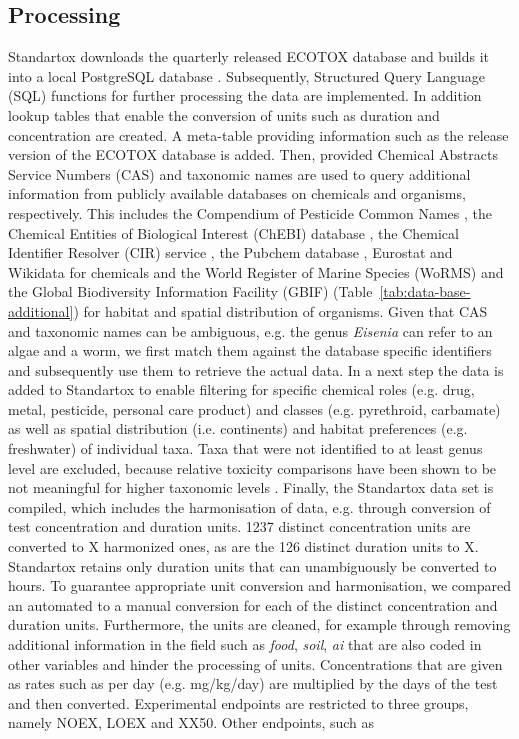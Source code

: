 \documentclass[journal,datadescriptor,accept,moreauthors,pdftex]{Definitions/mdpi}
\begin{document}
\subsection{Processing}
Standartox downloads the quarterly released ECOTOX database and builds it into a local PostgreSQL database \citep{szocs_build_2019}. Subsequently, Structured Query Language (SQL) functions for further processing the data are implemented. In addition lookup tables that enable the conversion of units such as duration and concentration are created. A meta-table providing information such as the release version of the ECOTOX database is added. Then, provided Chemical Abstracts Service Numbers (CAS) and taxonomic names are used to query additional information from publicly available databases on chemicals and organisms, respectively. This includes the Compendium of Pesticide Common Names \citep{wood_compendium_2019}, the Chemical Entities of Biological Interest (ChEBI) database \citep{hastings_chebi_2016}, the Chemical Identifier Resolver (CIR) service \citep{nationalinstitutesofhealthnih_chemical_2019}, the Pubchem database \citep{kim_pubchem_2016}, Eurostat \citep{europeancommission_eurostat_2019} and Wikidata \citep{vrandecic_wikidata_2014} for chemicals and the World Register of Marine Species (WoRMS) \citep{wormseditorialboard_world_2018} and the Global Biodiversity Information Facility (GBIF) \citep{gbif_gbif_2019} (Table~\ref{tab:data-base-additional}) for habitat and spatial distribution of organisms. Given that CAS and taxonomic names can be ambiguous, e.g. the genus \textit{Eisenia} can refer to an algae and a worm, we first match them against the database specific identifiers and subsequently use them to retrieve the actual data. In a next step the data is added to Standartox to enable filtering for specific chemical roles (e.g. drug, metal, pesticide, personal care product) and classes (e.g. pyrethroid, carbamate) as well as spatial distribution (i.e. continents) and habitat preferences (e.g. freshwater) of individual taxa. Taxa that were not identified to at least genus level are excluded, because relative toxicity comparisons have been shown to be not meaningful for higher taxonomic levels \citep{rainbow_trace_2002, buchwalter_differences_2005, malaj_physiological_2012}. Finally, the Standartox data set is compiled, which includes the harmonisation of data, e.g. through conversion of test concentration and duration units. 1237 distinct concentration units are converted to X harmonized ones, as are the 126 distinct duration units to X. Standartox retains only duration units that can unambiguously be converted to hours. To guarantee appropriate unit conversion and harmonisation, we compared an automated to a manual conversion for each of the distinct concentration and duration units. Furthermore, the units are cleaned, for example through removing additional information in the field such as \textit{food}, \textit{soil}, \textit{ai} that are also coded in other variables and hinder the processing of units. Concentrations that are given as rates such as per day (e.g. mg/kg/day) are multiplied by the days of the test and then converted. Experimental endpoints are restricted to three groups, namely NOEX, LOEX and XX50. Other endpoints, such as 
\end{document}
